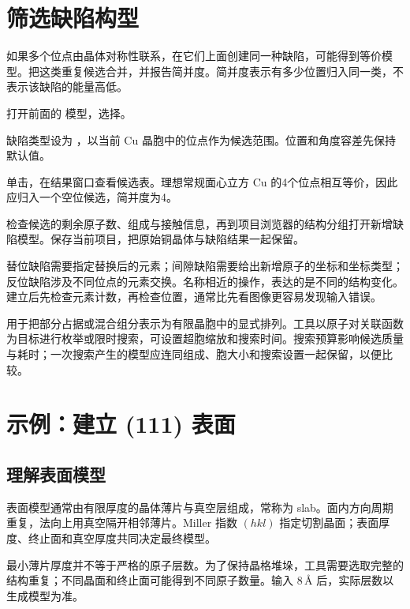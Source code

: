 \section{筛选缺陷构型}

如果多个位点由晶体对称性联系，在它们上面创建同一种缺陷，可能得到等价模型。把这类重复候选合并，并报告简并度。简并度表示有多少位置归入同一类，不表示该缺陷的能量高低。

\begin{steps}
  \item 打开前面的  模型，选择。
  \item 缺陷类型设为 ，以当前 Cu 晶胞中的位点作为候选范围。位置和角度容差先保持默认值。
  \item 单击，在结果窗口查看候选表。理想常规面心立方 Cu 的4个位点相互等价，因此应归入一个空位候选，简并度为4。
  \item 检查候选的剩余原子数、组成与接触信息，再到项目浏览器的结构分组打开新增缺陷模型。保存当前项目，把原始铜晶体与缺陷结果一起保留。
\end{steps}

替位缺陷需要指定替换后的元素；间隙缺陷需要给出新增原子的坐标和坐标类型；反位缺陷涉及不同位点的元素交换。名称相近的操作，表达的是不同的结构变化。建立后先检查元素计数，再检查位置，通常比先看图像更容易发现输入错误。

用于把部分占据或混合组分表示为有限晶胞中的显式排列。工具以原子对关联函数为目标进行枚举或限时搜索，可设置超胞缩放和搜索时间。搜索预算影响候选质量与耗时；一次搜索产生的模型应连同组成、胞大小和搜索设置一起保留，以便比较。

\section{示例：建立 (111) 表面}

\subsection{理解表面模型}

表面模型通常由有限厚度的晶体薄片与真空层组成，常称为 slab。面内方向周期重复，法向上用真空隔开相邻薄片。Miller 指数 $(hkl)$ 指定切割晶面；表面厚度、终止面和真空厚度共同决定最终模型。



最小薄片厚度并不等于严格的原子层数。为了保持晶格堆垛，工具需要选取完整的结构重复；不同晶面和终止面可能得到不同原子数量。输入 $8\,\text{\AA}$ 后，实际层数以生成模型为准。


